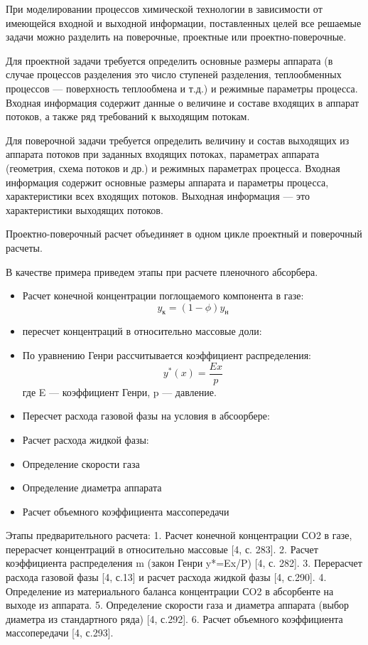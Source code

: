 При моделировании процессов химической технологии в зависимости от имеющейся входной и выходной информации, поставленных целей все решаемые задачи можно разделить на поверочные, проектные или проектно-поверочные.

Для проектной задачи требуется определить основные размеры аппарата (в случае процессов разделения это число ступеней разделения, теплообменных процессов --- поверхность теплообмена и т.д.) и режимные параметры процесса. Входная информация содержит данные о величине и составе входящих в аппарат потоков, а также ряд требований к выходящим потокам. 

Для поверочной задачи требуется определить величину и состав выходящих из аппарата потоков при заданных входящих потоках, параметрах аппарата (геометрия, схема потоков и др.) и режимных параметрах процесса. Входная информация содержит основные размеры аппарата и параметры процесса, характеристики всех входящих потоков. Выходная информация --- это характеристики выходящих потоков.

Проектно-поверочный расчет объединяет в одном цикле проектный и поверочный расчеты. 

В качестве примера приведем этапы при расчете пленочного абсорбера.
\begin{itemize}
\item Расчет конечной концентрации поглощаемого компонента в газе:
\begin{equation}
	y_к = (1-\phi) y_н
\end{equation}
\item пересчет концентраций в относительно массовые доли:

\item По уравнению Генри рассчитывается коэффициент распределения:
\begin{equation}
	y^*(x)=\dfrac{E x}{p}
\end{equation} 
где E --- коэффициент Генри, p --- давление.

\item Пересчет расхода газовой фазы на условия в абсоорбере:

\item Расчет расхода жидкой фазы:

\item Определение скорости газа
\item Определение диаметра аппарата

\item Расчет объемного коэффициента массопередачи

\end{itemize}
Этапы предварительного расчета:
1. Расчет конечной концентрации СO2 в газе, перерасчет концентраций в относительно массовые [4, с. 283].
2. Расчет коэффициента распределения m (закон Генри y*=Ex/P) [4, с. 282].
3. Перерасчет расхода газовой фазы [4, с.13] и расчет расхода жидкой фазы [4, с.290].
4. Определение из материального баланса концентрации СO2 в абсорбенте на выходе из аппарата.
5. Определение скорости газа и диаметра аппарата (выбор диаметра из стандартного ряда) [4, с.292].
6. Расчет объемного коэффициента массопередачи [4, с.293].


